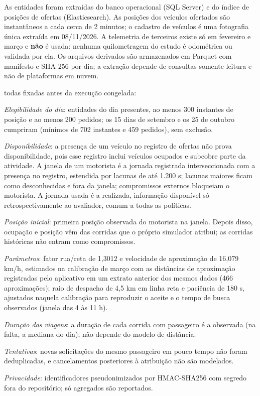 
As entidades foram extraídas do banco operacional (SQL Server) e do índice de posições de ofertas (Elasticsearch). As posições dos veículos ofertados são instantâneos a cada cerca de 2 minutos; o cadastro de veículos é uma fotografia única extraída em 08/11/2026. A telemetria de terceiros existe só em fevereiro e março e \textbf{não} é usada: nenhuma quilometragem do estudo é odométrica ou validada por ela. Os arquivos derivados são armazenados em Parquet com manifesto e SHA-256 por dia; a extração depende de consultas somente leitura e não de plataformas em nuvem.


todas fixadas antes da execução congelada:
\begin{alineas}
\item \textit{Elegibilidade do dia}: entidades do dia presentes, ao menos 300 instantes de posição e ao menos 200 pedidos; os 15 dias de setembro e os 25 de outubro cumpriram (mínimos de 702 instantes e 459 pedidos), sem exclusão.
\item \textit{Disponibilidade}: a presença de um veículo no registro de ofertas não prova disponibilidade, pois esse registro inclui veículos ocupados e subcobre parte da atividade. A janela de um motorista é a jornada registrada interseccionada com a presença no registro, estendida por lacunas de até 1.200 s; lacunas maiores ficam como desconhecidas e fora da janela; compromissos externos bloqueiam o motorista. A jornada usada é a realizada, informação disponível só retrospectivamente ao avaliador, comum a todas as políticas.
\item \textit{Posição inicial}: primeira posição observada do motorista na janela. Depois disso, ocupação e posição vêm das corridas que o próprio simulador atribui; as corridas históricas não entram como compromissos.
\item \textit{Parâmetros}: fator rua/reta de 1,3012 e velocidade de aproximação de 16,079 km/h, estimados na calibração de março com as distâncias de aproximação registradas pelo aplicativo em um extrato anterior dos mesmos dados (466 aproximações); raio de despacho de 4,5 km em linha reta e paciência de 180 s, ajustados naquela calibração para reproduzir o aceite e o tempo de busca observados (janela das 4 às 11 h).
\item \textit{Duração das viagens}: a duração de cada corrida com passageiro é a observada (na falta, a mediana do dia); não depende do modelo de distância.
\item \textit{Tentativas}: novas solicitações do mesmo passageiro em pouco tempo não foram deduplicadas, e cancelamentos posteriores à atribuição não são modelados.
\item \textit{Privacidade}: identificadores pseudonimizados por HMAC-SHA256 com segredo fora do repositório; só agregados são reportados.
\end{alineas}

